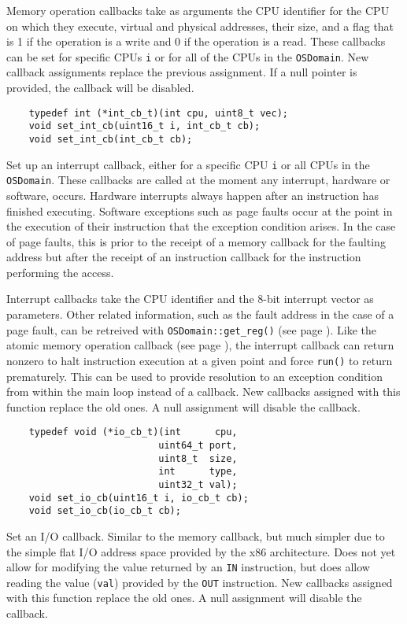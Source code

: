 \documentclass[letterpaper, 10pt]{book}
\begin{document}
Memory operation callbacks take as arguments the CPU identifier for the CPU
on which they execute, virtual and physical addresses, their size, and a flag
that is 1 if the operation is a write and 0 if the operation is a read. These
callbacks can be set for specific CPUs \texttt{i} or for all of the CPUs in the
\texttt{OSDomain}. New callback assignments replace the previous assignment. If
a null pointer is provided, the callback will be disabled.

\label{func:set_int_cb} \begin{verbatim}
    typedef int (*int_cb_t)(int cpu, uint8_t vec);
    void set_int_cb(uint16_t i, int_cb_t cb);
    void set_int_cb(int_cb_t cb);
\end{verbatim}
Set up an interrupt callback, either for a specific CPU \texttt{i} or all CPUs
in the \texttt{OSDomain}. These callbacks are called at the moment any
interrupt, hardware or software, occurs. Hardware interrupts always happen
after an instruction has finished executing. Software exceptions such as page
faults occur at the point in the execution of their instruction that the
exception condition arises. In the case of page faults, this is prior to the
receipt of a memory callback for the faulting address but after the receipt of
an instruction callback for the instruction performing the access.

Interrupt callbacks take the CPU identifier and the 8-bit interrupt vector as
parameters. Other related information, such as the fault address in the case of
a page fault, can be retreived with \texttt{OSDomain::get\_reg()} (see page 
\pageref{func:get_reg}).  Like the atomic memory operation callback (see page 
\pageref{func:set_atomic_cb}), the interrupt callback can return nonzero to
halt instruction execution at a given point and force \texttt{run()} to return
prematurely. This can be used to provide resolution to an exception condition
from within the main loop instead of a callback. New callbacks
assigned with this function replace the old ones. A null assignment will
disable the callback.

\label{func:set_io_cb} \begin{verbatim}
    typedef void (*io_cb_t)(int      cpu, 
                           uint64_t port, 
                           uint8_t  size, 
                           int      type, 
                           uint32_t val);
    void set_io_cb(uint16_t i, io_cb_t cb);
    void set_io_cb(io_cb_t cb);
\end{verbatim}
Set an I/O callback. Similar to the memory callback, but much simpler due to
the simple flat I/O address space provided by the x86 architecture. Does not
yet allow for modifying the value returned by an \texttt{IN} instruction, but
does allow reading the value (\texttt{val}) provided by the \texttt{OUT}
instruction. New callbacks assigned with this function replace the old ones. A
null assignment will disable the callback.
\end{document}
